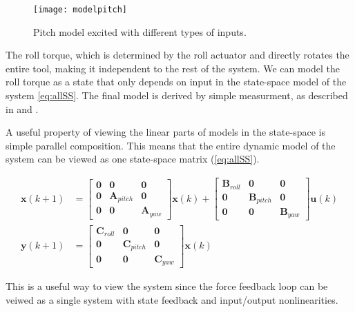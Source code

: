 {\begin{figure}[H]
\hspace{-2.5em}\texttt{[image: modelpitch]}
\caption{Pitch model excited with different types of inputs.}
\label{fig:final_res_pitch}
\end{figure}

The roll torque, which is determined by the roll actuator and directly rotates the entire tool, making it independent to the rest of the system.
We can model the roll torque as a state that only depends on input in the state-space model of the system \ref{eq:allSS}.
The final model is derived by simple measurment, as described in  and .

A  useful property of viewing the linear parts of models in the state-space is simple parallel composition.
This means that the entire dynamic model of the system can be viewed as one state-space matrix (\ref{eq:allSS}).

\begin{align}\label{eq:allSS}
\mathbf{x}(k+1) &= 
\begin{bmatrix} \mathbf{0} & \mathbf{0} & \mathbf{0}\\
 \mathbf{0} & \mathbf{A}_{pitch} &\mathbf{0}\\
 \mathbf{0} &\mathbf{0} & \mathbf{A}_{yaw}  \end{bmatrix} 
 \mathbf{x}(k) + 
\begin{bmatrix} \mathbf{B}_{roll} & \mathbf{0} & \mathbf{0}\\
 \mathbf{0} & \mathbf{B}_{pitch} &\mathbf{0}\\
 \mathbf{0} &\mathbf{0} & \mathbf{B}_{yaw}  \end{bmatrix} 
 \mathbf{u}(k)\\
\mathbf{y}(k+1) &= 
\begin{bmatrix} \mathbf{C}_{roll} & \mathbf{0} & \mathbf{0}\\
 \mathbf{0} & \mathbf{C}_{pitch} &\mathbf{0}\\
 \mathbf{0} &\mathbf{0} & \mathbf{C}_{yaw}  \end{bmatrix} 
\mathbf{x}(k) 
\end{align}

This is a useful way to view the system since the force feedback loop can be veiwed as a single system with state feedback and input/output nonlinearities.

}
